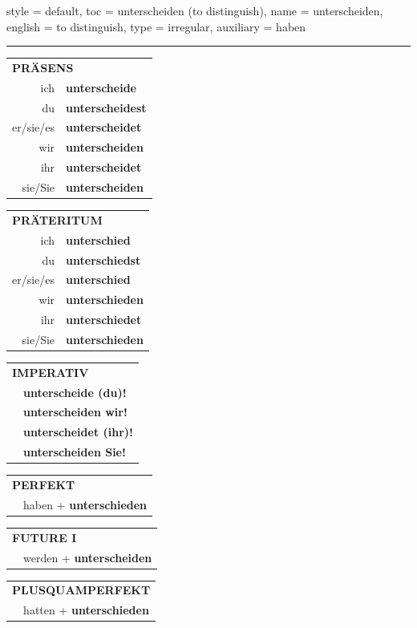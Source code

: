 \begin{verbentry}{
  style = {default},
  toc = {unterscheiden (to distinguish)},
  name = {unterscheiden},
  english = {to distinguish},
  type = {irregular},
  auxiliary = {haben}
}
 

\vspace{5pt}
\hrule
\vspace{5pt}

\begin{tabular}{rl}
\multicolumn{2}{l}{\textbf{PRÄSENS}}\\
ich & \textbf{unterscheide}\\
du & \textbf{unterscheidest}\\
er/sie/es & \textbf{unterscheidet}\\
wir & \textbf{unterscheiden}\\
ihr & \textbf{unterscheidet}\\
sie/Sie & \textbf{unterscheiden}\\
\end{tabular}
\hfill
\begin{tabular}{rl}
\multicolumn{2}{l}{\textbf{PRÄTERITUM}}\\
ich & \textbf{unterschied}\\
du & \textbf{unterschiedst}\\
er/sie/es & \textbf{unterschied}\\
wir & \textbf{unterschieden}\\
ihr & \textbf{unterschiedet}\\
sie/Sie & \textbf{unterschieden}\\
\end{tabular}
\hfill
\begin{tabular}{rl}
\multicolumn{2}{l}{\textbf{IMPERATIV}}\\
& \textbf{unterscheide (du)!}\\
& \textbf{unterscheiden wir!}\\
& \textbf{unterscheidet (ihr)!}\\
& \textbf{unterscheiden Sie!}\\
\end{tabular}

\vspace{10pt}

\begin{tabular}{rl}
\multicolumn{2}{l}{\textbf{PERFEKT}}\\
& haben + \textbf{unterschieden}\\
\end{tabular}
\hfill
\begin{tabular}{rl}
\multicolumn{2}{l}{\textbf{FUTURE I}}\\
& werden + \textbf{unterscheiden}\\
\end{tabular}
\hfill
\begin{tabular}{rl}
\multicolumn{2}{l}{\textbf{PLUSQUAMPERFEKT}}\\
& hatten + \textbf{unterschieden}\\
\end{tabular}


\end{verbentry}
